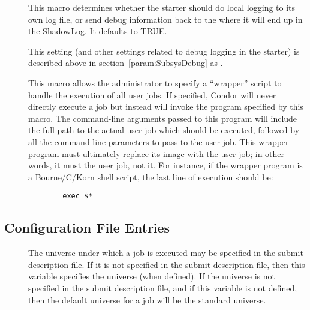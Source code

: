 \begin{description}
\item[]
  \label{param:StarterLocalLogging} This macro determines whether the
  starter should do local logging to its own log file, or send debug
  information back to the  where it will end up in the
  ShadowLog.  It defaults to TRUE.

\item[] \label{param:StarterDebug} This setting
  (and other settings related to debug logging in the starter) is
  described above in section~\ref{param:SubsysDebug} as
  .

\item[] \label{param:UserJobWrapper} This macro
  allows the administrator to specify a ``wrapper'' script to handle the
  execution of all user jobs.  
  If specified, Condor will never directly execute a job but instead will
  invoke the program specified by this macro.
  The command-line arguments passed to this program will include the
  full-path to the actual user job which should be executed, followed by all
  the command-line parameters to pass to the user job.
  This wrapper program must ultimately replace its image with the user job;
  in other words, it must  the user job, not  it.
  For instance, if the wrapper program is a Bourne/C/Korn shell script, the
  last line of execution should be:
\begin{verbatim}
        exec $*
\end{verbatim}

\end{description}

\subsection{\label{sec:Submit-Config-File-Entries}
 Configuration File Entries}
\begin{description}
\item[] \label{param:DefaultUniverse}
The universe under which a job is executed may be specified in the submit
description file.
If it is not specified in the submit description file, then
this variable specifies the universe (when defined).
If the universe is not specified in the submit description
file, and if this variable is not defined, then
the default universe for a job will be the standard universe.
\end{description}


